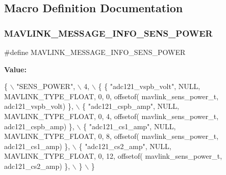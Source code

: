 \subsection{Macro Definition Documentation}
\mbox{\label{mavlink__msg__sens__power_8h_a6f81dfe4dd1455f7f34675cbade485b6}} 
\subsubsection{M\+A\+V\+L\+I\+N\+K\+\_\+\+M\+E\+S\+S\+A\+G\+E\+\_\+\+I\+N\+F\+O\+\_\+\+S\+E\+N\+S\+\_\+\+P\+O\+W\+ER}
{\footnotesize\ttfamily \#define M\+A\+V\+L\+I\+N\+K\+\_\+\+M\+E\+S\+S\+A\+G\+E\+\_\+\+I\+N\+F\+O\+\_\+\+S\+E\+N\+S\+\_\+\+P\+O\+W\+ER}

{\bfseries Value\+:}
\begin{DoxyCode}
\{ \(\backslash\)
    \textcolor{stringliteral}{"SENS\_POWER"}, \(\backslash\)
    4, \(\backslash\)
    \{  \{ \textcolor{stringliteral}{"adc121\_vspb\_volt"}, NULL, MAVLINK_TYPE_FLOAT, 0, 0, offsetof(
      mavlink_sens_power_t, adc121\_vspb\_volt) \}, \(\backslash\)
         \{ \textcolor{stringliteral}{"adc121\_cspb\_amp"}, NULL, MAVLINK_TYPE_FLOAT, 0, 4, offsetof(
      mavlink_sens_power_t, adc121\_cspb\_amp) \}, \(\backslash\)
         \{ \textcolor{stringliteral}{"adc121\_cs1\_amp"}, NULL, MAVLINK_TYPE_FLOAT, 0, 8, offsetof(
      mavlink_sens_power_t, adc121\_cs1\_amp) \}, \(\backslash\)
         \{ \textcolor{stringliteral}{"adc121\_cs2\_amp"}, NULL, MAVLINK_TYPE_FLOAT, 0, 12, offsetof(
      mavlink_sens_power_t, adc121\_cs2\_amp) \}, \(\backslash\)
         \} \(\backslash\)
\}
\end{DoxyCode}
\mbox{\label{mavlink__msg__sens__power_8h_a9102c9febd387eaffc1b63e93255923d}} 
